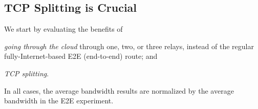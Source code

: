\documentclass[10pt,sigconf]{acmart}
\newcommand{\mycomm}[3]{{\color{#2} \textbf{[#1: #3]}}}
\newcommand{\mycomm}[3]{}
\newcommand{\IK}[1]{\mycomm{IK}{blue}{#1}}
\newcommand{\AB}[1]{\mycomm{AB}{orange}{#1}}
\newcommand{\NR}[1]{\mycomm{NR}{violet}{#1}}
\begin{document}






\subsection{TCP Splitting is Crucial} 

We start by evaluating the benefits of 
\begin{inlinelist}
    \item \textit{going through the cloud} through one, two, or three relays,  instead of the regular fully-Internet-based E2E (end-to-end) route; and \item \textit{TCP splitting}.
\end{inlinelist} In all cases, the average bandwidth results are normalized by the average bandwidth in the E2E experiment.
\end{document}

